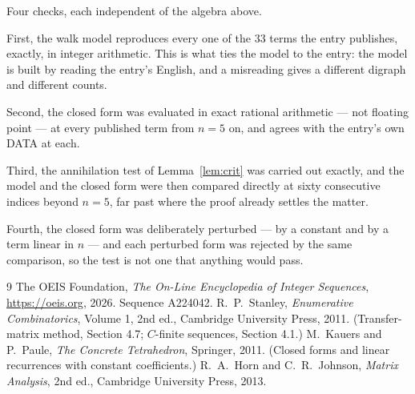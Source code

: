 \documentclass[11pt,a4paper]{article}
\theoremstyle{plain}
\theoremstyle{definition}
\begin{document}
Four checks, each independent of the algebra above.

First, the walk model reproduces every one of the $33$ terms the entry publishes,
exactly, in integer arithmetic. This is what ties the model to the entry: the model is built
by reading the entry's English, and a misreading gives a different digraph and different
counts.

Second, the closed form was evaluated in exact rational arithmetic --- not floating point ---
at every published term from $n=5$ on, and agrees with the entry's own DATA at each.

Third, the annihilation test of Lemma~\ref{lem:crit} was carried out exactly, and the model
and the closed form were then compared directly at sixty consecutive indices beyond
$n=5$, far past where the proof already settles the matter.

Fourth, the closed form was deliberately perturbed --- by a constant and by a term linear in
$n$ --- and each perturbed form was rejected by the same comparison, so the test is not one
that anything would pass.

\begin{thebibliography}{9}
 The OEIS Foundation, \emph{The On-Line Encyclopedia of Integer
Sequences}, \url{https://oeis.org}, 2026. Sequence A224042.
 R.~P.~Stanley, \emph{Enumerative Combinatorics}, Volume 1, 2nd ed.,
Cambridge University Press, 2011. (Transfer-matrix method, Section 4.7; $C$-finite sequences,
Section 4.1.)
 M.~Kauers and P.~Paule, \emph{The Concrete Tetrahedron}, Springer, 2011.
(Closed forms and linear recurrences with constant coefficients.)
 R.~A.~Horn and C.~R.~Johnson, \emph{Matrix Analysis}, 2nd ed., Cambridge
University Press, 2013.
\end{thebibliography}
\end{document}
